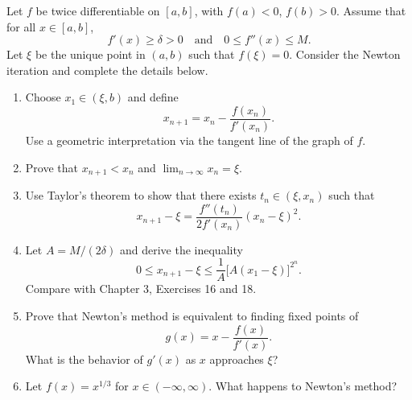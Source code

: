 \documentclass{article}
\begin{document}
\begin{problem}[5-25]
Let $f$ be twice differentiable on $[a,b]$, with $f(a)<0$, $f(b)>0$. Assume that for all $x\in[a,b]$,
\[
f'(x)\ge \delta>0\quad\text{and}\quad 0\le f''(x)\le M.
\]
Let $\xi$ be the unique point in $(a,b)$ such that $f(\xi)=0$. Consider the Newton iteration and complete the details below.
\begin{enumerate}[label=(\alph*)]
  \item Choose $x_1\in(\xi,b)$ and define
  \[
  x_{n+1}=x_n-\frac{f(x_n)}{f'(x_n)}.
  \]
  Use a geometric interpretation via the tangent line of the graph of $f$.
  \item Prove that $x_{n+1}<x_n$ and $\lim_{n\to\infty}x_n=\xi$.
  \item Use Taylor's theorem to show that there exists $t_n\in(\xi,x_n)$ such that
  \[
  x_{n+1}-\xi=\frac{f''(t_n)}{2f'(x_n)}(x_n-\xi)^2.
  \]
  \item Let $A=M/(2\delta)$ and derive the inequality
  \[
  0\le x_{n+1}-\xi\le \frac{1}{A}\bigl[A(x_1-\xi)\bigr]^{2^n}.
  \]
  Compare with Chapter 3, Exercises 16 and 18.
  \item Prove that Newton's method is equivalent to finding fixed points of
  \[
  g(x)=x-\frac{f(x)}{f'(x)}.
  \]
  What is the behavior of $g'(x)$ as $x$ approaches $\xi$?
  \item Let $f(x)=x^{1/3}$ for $x\in(-\infty,\infty)$. What happens to Newton's method?
\end{enumerate}
\end{problem}
\end{document}
